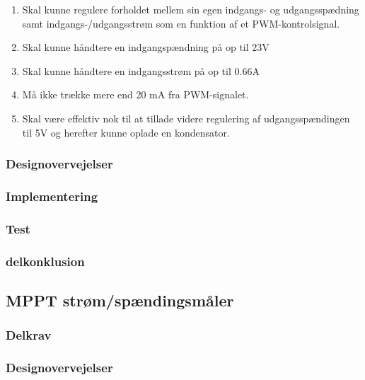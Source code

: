 \documentclass[../main.tex]{subfiles}
\begin{document}
            \begin{enumerate}
                \item Skal kunne regulere forholdet mellem sin egen indgangs- og udgangsspædning samt indgangs-/udgangsstrøm som en funktion af et PWM-kontrolsignal.
                \item Skal kunne håndtere en indgangspændning på op til 23V
                \item Skal kunne håndtere en indgangsstrøm på op til 0.66A
                \item Må ikke trække mere end 20 mA fra PWM-signalet.
                \item Skal være effektiv nok til at tillade videre regulering af udgangsspændingen til 5V og herefter kunne oplade en kondensator.
            \end{enumerate}
            
        
        \subsubsection{Designovervejelser}
        
        \subsubsection{Implementering}
        
        \subsubsection{Test}
        
        \subsubsection{delkonklusion}

    \subsection{MPPT strøm/spændingsmåler}

        \subsubsection{Delkrav}
        
        \subsubsection{Designovervejelser}
        
\end{document}
